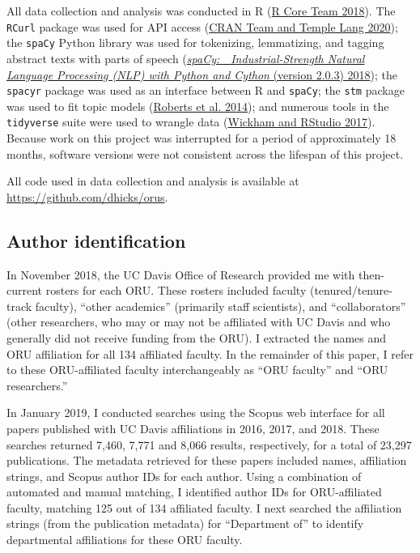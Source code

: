 \documentclass[
  11pt,
]{article}
\begin{document}
All data collection and analysis was conducted in R (\protect\hyperlink{ref-RCoreTeamLanguageEnvironmentStatistical2018}{R Core Team 2018}). The \texttt{RCurl} package was used for API access (\protect\hyperlink{ref-CRANTeamRCurlGeneralNetwork2020}{CRAN Team and Temple Lang 2020}); the \texttt{spaCy} Python library was used for tokenizing, lemmatizing, and tagging abstract texts with parts of speech (\protect\hyperlink{ref-SpaCyIndustrialstrengthNatural2018}{\emph{spaCy: 💫 Industrial-Strength Natural Language Processing (NLP) with Python and Cython} (version 2.0.3) 2018}); the \texttt{spacyr} package was used as an interface between R and \texttt{spaCy}; the \texttt{stm} package was used to fit topic models (\protect\hyperlink{ref-RobertsStructuralTopicModels2014}{Roberts et al. 2014}); and numerous tools in the \texttt{tidyverse} suite were used to wrangle data (\protect\hyperlink{ref-WickhamTidyverseEasilyInstall2017}{Wickham and RStudio 2017}). Because work on this project was interrupted for a period of approximately 18 months, software versions were not consistent across the lifespan of this project.

All code used in data collection and analysis is available at \url{https://github.com/dhicks/orus}.

\hypertarget{author-identification}{%
\subsection{Author identification}\label{author-identification}}

In November 2018, the UC Davis Office of Research provided me with then-current rosters for each ORU. These rosters included faculty (tenured/tenure-track faculty), ``other academics'' (primarily staff scientists), and ``collaborators'' (other researchers, who may or may not be affiliated with UC Davis and who generally did not receive funding from the ORU). I extracted the names and ORU affiliation for all 134 affiliated faculty. In the remainder of this paper, I refer to these ORU-affiliated faculty interchangeably as ``ORU faculty'' and ``ORU researchers.''

In January 2019, I conducted searches using the Scopus web interface for all papers published with UC Davis affiliations in 2016, 2017, and 2018. These searches returned 7,460, 7,771 and 8,066 results, respectively, for a total of 23,297 publications. The metadata retrieved for these papers included names, affiliation strings, and Scopus author IDs for each author. Using a combination of automated and manual matching, I identified author IDs for ORU-affiliated faculty, matching 125 out of 134 affiliated faculty. I next searched the affiliation strings (from the publication metadata) for ``Department of'' to identify departmental affiliations for these ORU faculty.
\end{document}
